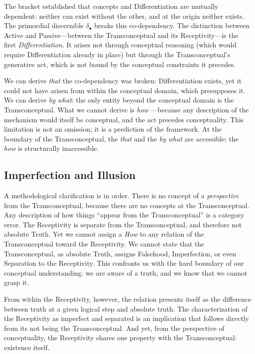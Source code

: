 The bracket established that concepts and Differentiation are mutually
dependent: neither can exist without the other, and at the origin neither
exists. The primordial discernible $\delta_\bullet$ breaks this co-dependency.
The distinction between Active and Passive---between the Transconceptual and
its Receptivity---is the first \textit{Differentiation}. It arises not through
conceptual reasoning (which would require Differentiation already in place) but
through the Transconceptual's generative act, which is not bound by the
conceptual constraints it precedes.

We can derive \textit{that} the co-dependency was broken: Differentiation
exists, yet it could not have arisen from within the conceptual domain, which
presupposes it. We can derive \textit{by what}: the only entity beyond the
conceptual domain is the Transconceptual. What we cannot derive is \textit{how}
---because any description of the mechanism would itself be conceptual, and the
act precedes conceptuality. This limitation is not an omission; it is a
prediction of the framework. At the boundary of the Transconceptual, the \textit{that}
and the \textit{by what} are accessible; the \textit{how} is structurally
inaccessible.

\subsection{Imperfection and Illusion}

A methodological clarification is in order. There is no concept of a
\textit{perspective} from the Transconceptual, because there are no concepts at
the Transconceptual. Any description of how things ``appear from the
Transconceptual'' is a category error. The Receptivity is separate from the
Transconceptual, and therefore not absolute Truth. Yet we cannot assign a
\textit{How} to any relation of the Transconceptual toward the Receptivity. We
cannot state that the Transconceptual, as absolute Truth, assigns Falsehood,
Imperfection, or even Separation to the Receptivity. This confronts us with
the hard boundary of our conceptual understanding: we are aware of a truth,
and we know that we cannot grasp it.

From within the Receptivity, however, the relation presents itself as the
difference between truth at a given logical step and absolute truth. The
characterization of the Receptivity as imperfect and separated is an
implication that follows directly from its not being the Transconceptual. And
yet, from the perspective of conceptuality, the Receptivity shares one
property with the Transconceptual: existence itself.

